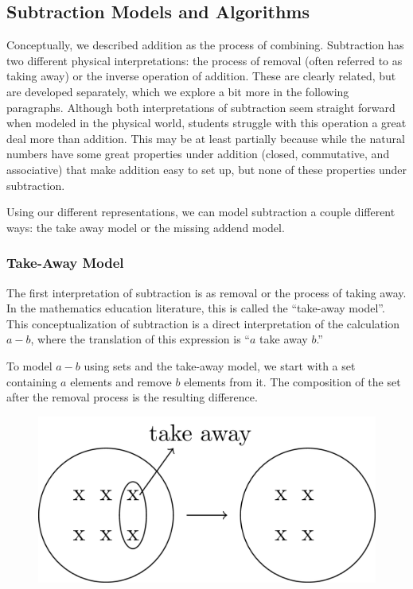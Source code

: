 \documentclass[
]{book}
\theoremstyle{definition}
\theoremstyle{definition}
\theoremstyle{definition}
\theoremstyle{definition}
\theoremstyle{remark}
\begin{document}
\hypertarget{subtraction-models-and-algorithms}{%
\subsection{Subtraction Models and Algorithms}\label{subtraction-models-and-algorithms}}

Conceptually, we described addition as the process of combining. Subtraction has two different physical interpretations: the process of removal (often referred to as taking away) or the inverse operation of addition. These are clearly related, but are developed separately, which we explore a bit more in the following paragraphs. Although both interpretations of subtraction seem straight forward when modeled in the physical world, students struggle with this operation a great deal more than addition. This may be at least partially because while the natural numbers have some great properties under addition (closed, commutative, and associative) that make addition easy to set up, but none of these properties under subtraction.

Using our different representations, we can model subtraction a couple different ways: the take away model or the missing addend model.

\hypertarget{take-away-model}{%
\subsubsection*{Take-Away Model}\label{take-away-model}}

The first interpretation of subtraction is as removal or the process of taking away. In the mathematics education literature, this is called the ``take-away model''. This conceptualization of subtraction is a direct interpretation of the calculation \(a-b\), where the translation of this expression is ``\(a\) take away \(b\).''

To model \(a-b\) using sets and the take-away model, we start with a set containing \(a\) elements and remove \(b\) elements from it. The composition of the set after the removal process is the resulting difference.

\begin{figure}

{\centering \includegraphics[width=0.3\linewidth]{tikz/subtraction-model-sets} 

}

\end{figure}
\end{document}

